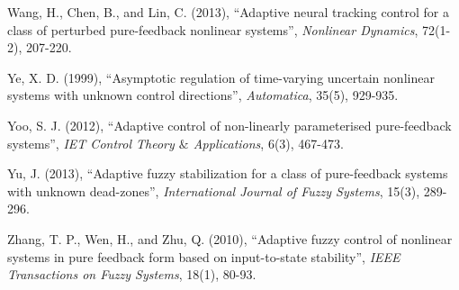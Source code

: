 \documentclass{tSYS2e}
\theoremstyle{plain}
\theoremstyle{definition}
\begin{document}
\begin{thebibliography}{99}
 Wang, H., Chen, B., and Lin, C.
(2013), ``Adaptive neural tracking control for a class of perturbed
pure-feedback nonlinear systems'', {\itshape Nonlinear Dynamics}, 72(1-2), 207-220.

 Ye, X. D. (1999), ``Asymptotic regulation of
time-varying uncertain nonlinear systems with unknown control directions'',
{\itshape Automatica}, 35(5), 929-935.

 Yoo, S. J. (2012), ``Adaptive control of
non-linearly parameterised pure-feedback systems'', {\itshape IET Control Theory $\&$
Applications}, 6(3), 467-473.

 Yu, J. (2013), ``Adaptive fuzzy stabilization for a
class of pure-feedback systems with unknown dead-zones'', {\itshape International
Journal of Fuzzy Systems}, 15(3), 289-296.

 Zhang, T. P., Wen, H., and
Zhu, Q. (2010), ``Adaptive fuzzy control of nonlinear systems in pure feedback
form based on input-to-state stability'', {\itshape IEEE Transactions on Fuzzy Systems},
18(1), 80-93.
\end{thebibliography}
\end{document}
